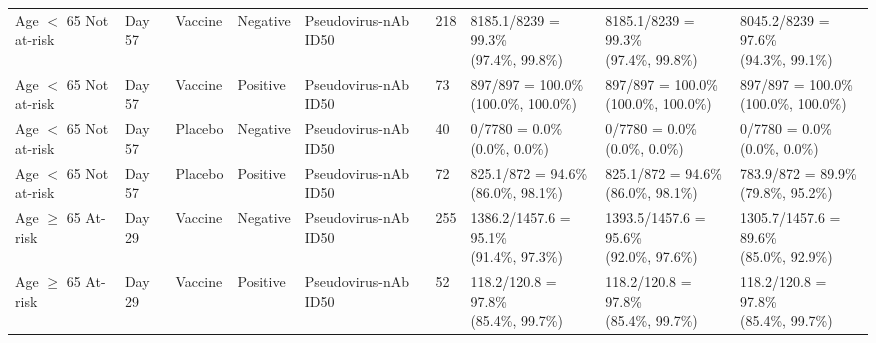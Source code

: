 \documentclass[]{book}
\theoremstyle{definition}
\theoremstyle{definition}
\theoremstyle{definition}
\newcommand{\1}{\mathbbm{1}}
\begin{document}
\begin{landscape}
\begin{ThreePartTable}
\begin{longtable}[t]{>{\raggedright\arraybackslash}p{2.7cm}llllllll}
\hspace{1em}Age $<$ 65 Not at-risk & Day 57 & Vaccine & Negative & Pseudovirus-nAb ID50 & 218 & \makecell[l]{8185.1/8239 = 99.3\%\\(97.4\%, 99.8\%)} & \makecell[l]{8185.1/8239 = 99.3\%\\(97.4\%, 99.8\%)} & \makecell[l]{8045.2/8239 = 97.6\%\\(94.3\%, 99.1\%)}\\
\hspace{1em}Age $<$ 65 Not at-risk & Day 57 & Vaccine & Positive & Pseudovirus-nAb ID50 & 73 & \makecell[l]{897/897 = 100.0\%\\(100.0\%, 100.0\%)} & \makecell[l]{897/897 = 100.0\%\\(100.0\%, 100.0\%)} & \makecell[l]{897/897 = 100.0\%\\(100.0\%, 100.0\%)}\\
\hspace{1em}Age $<$ 65 Not at-risk & Day 57 & Placebo & Negative & Pseudovirus-nAb ID50 & 40 & \makecell[l]{0/7780 = 0.0\%\\(0.0\%, 0.0\%)} & \makecell[l]{0/7780 = 0.0\%\\(0.0\%, 0.0\%)} & \makecell[l]{0/7780 = 0.0\%\\(0.0\%, 0.0\%)}\\
\hspace{1em}Age $<$ 65 Not at-risk & Day 57 & Placebo & Positive & Pseudovirus-nAb ID50 & 72 & \makecell[l]{825.1/872 = 94.6\%\\(86.0\%, 98.1\%)} & \makecell[l]{825.1/872 = 94.6\%\\(86.0\%, 98.1\%)} & \makecell[l]{783.9/872 = 89.9\%\\(79.8\%, 95.2\%)}\\
\hspace{1em}Age $\geq$ 65 At-risk & Day 29 & Vaccine & Negative & Pseudovirus-nAb ID50 & 255 & \makecell[l]{1386.2/1457.6 = 95.1\%\\(91.4\%, 97.3\%)} & \makecell[l]{1393.5/1457.6 = 95.6\%\\(92.0\%, 97.6\%)} & \makecell[l]{1305.7/1457.6 = 89.6\%\\(85.0\%, 92.9\%)}\\
\hspace{1em}Age $\geq$ 65 At-risk & Day 29 & Vaccine & Positive & Pseudovirus-nAb ID50 & 52 & \makecell[l]{118.2/120.8 = 97.8\%\\(85.4\%, 99.7\%)} & \makecell[l]{118.2/120.8 = 97.8\%\\(85.4\%, 99.7\%)} & \makecell[l]{118.2/120.8 = 97.8\%\\(85.4\%, 99.7\%)}\\

\end{longtable}
\end{ThreePartTable}
\end{landscape}
\end{document}
